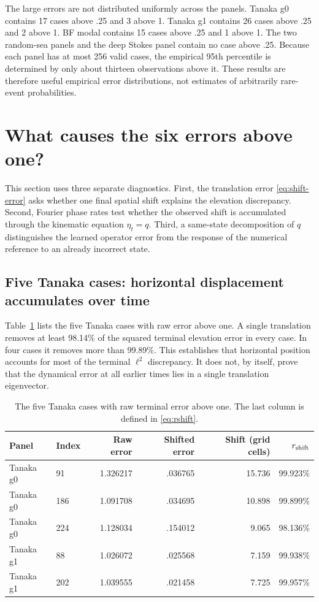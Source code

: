 \documentclass[11pt]{article}
\begin{document}
The large errors are not distributed uniformly across the panels.  Tanaka g0
contains 17 cases above .25 and 3 above 1.  Tanaka g1 contains 26 cases above
.25 and 2 above 1.  BF modal contains 15 cases above .25 and 1 above 1.  The
two random-sea panels and the deep Stokes panel contain no case above .25.
Because each panel has at most 256 valid cases, the empirical 95th percentile
is determined by only about thirteen observations above it.  These results
are therefore useful empirical error distributions, not estimates of
arbitrarily rare-event probabilities.

\section{What causes the six errors above one?}

This section uses three separate diagnostics.  First, the translation error
\eqref{eq:shift-error} asks whether one final spatial shift explains the
elevation discrepancy.  Second, Fourier phase rates test whether the observed
shift is accumulated through the kinematic equation $\eta_t=q$.  Third, a
same-state decomposition of $q$ distinguishes the learned operator error from
the response of the numerical reference to an already incorrect state.

\subsection{Five Tanaka cases: horizontal displacement accumulates over time}

Table~\ref{tab:tanaka-six} lists the five Tanaka cases with raw error above
one.  A single translation removes at least 98.14\% of the squared terminal
elevation error in every case.  In four cases it removes more than 99.89\%.
This establishes that horizontal position accounts for most of the terminal
$\ell^2$ discrepancy.  It does not, by itself, prove that the dynamical error
at all earlier times lies in a single translation eigenvector.

\begin{table}[htbp]
\centering
\small
\begin{tabular}{llrrrr}
\toprule
Panel & Index & Raw error & Shifted error & Shift (grid cells) & $r_{\rm shift}$ \\
\midrule
Tanaka g0 & 91  & 1.326217 & .036765 & 15.736 & 99.923\% \\
Tanaka g0 & 186 & 1.091708 & .034695 & 10.898 & 99.899\% \\
Tanaka g0 & 224 & 1.128034 & .154012 & 9.065  & 98.136\% \\
Tanaka g1 & 88  & 1.026072 & .025568 & 7.159  & 99.938\% \\
Tanaka g1 & 202 & 1.039555 & .021458 & 7.725  & 99.957\% \\
\bottomrule
\end{tabular}
\caption{The five Tanaka cases with raw terminal error above one.  The last
column is defined in \eqref{eq:rshift}.}
\label{tab:tanaka-six}
\end{table}
\end{document}
